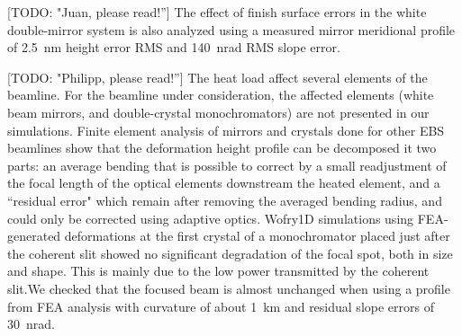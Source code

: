 \documentclass{iucr}              %
\newcommand{\todo}[1]{{\color{red}[TODO: "#1'']}}
\begin{document}

\todo{Juan, please read!} The effect of finish surface errors in the white double-mirror system is also analyzed using a measured mirror meridional profile of \SI{2.5}{\nano\meter} height error RMS and \SI{140}{\nano\radian} RMS slope error. 

\todo{Philipp, please read!} The heat load affect several elements of the beamline. For the beamline under consideration, the affected elements (white beam mirrors, and double-crystal monochromators) are not presented in our simulations. Finite element analysis of mirrors and crystals done for other EBS beamlines \cite{Brumund} show that the deformation height profile can be decomposed it two parts: an average bending that is possible to correct by a small readjustment of the focal length of the optical elements downstream the heated element, and a ``residual error" which remain after removing the averaged bending radius, and could only be corrected using adaptive optics. Wofry1D simulations using FEA-generated deformations at the first crystal of a monochromator placed just after the coherent slit showed no significant degradation of the focal spot, both in size and shape. This is mainly due to the low power transmitted by the coherent slit.We checked that the focused beam is almost unchanged when using a profile from FEA analysis with curvature of about \SI{1}{\kilo\meter} and residual slope errors of \SI{30}{\nano\radian}. 



\end{document}
